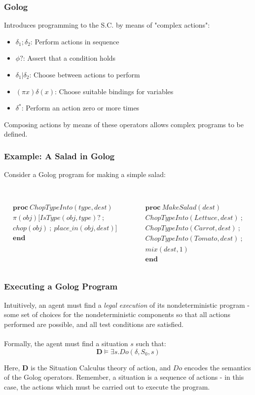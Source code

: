 \documentclass{beamer}
\begin{document}
\begin{frame}
\frametitle{Golog}
Introduces programming to the S.C. by means of "complex actions":
\begin{itemize}
  \pause
  \item $\delta_1;\delta_2$: Perform actions in sequence
  \pause
  \item $\phi?$: Assert that a condition holds
  \pause
  \item $\delta_1|\delta_2$: Choose between actions to perform
  \pause
  \item $(\pi x)\delta(x)$: Choose suitable bindings for variables
  \pause
  \item $\delta^*$: Perform an action zero or more times
  \pause
\end{itemize}
Composing actions by means of these operators allows complex programs
to be defined.
\end{frame}

\begin{frame}
\frametitle{Example: A Salad in Golog}
Consider a Golog program for making a simple salad:\\
\ \\
\begin{columns}
  \begin{column}{0.5\textwidth}
\[
\begin{array}{c}
\mathbf{proc}\ ChopTypeInto(type,dest)\\
\pi(obj)[IsType(obj,type)?\ ;\\
chop(obj)\ ;\ place\_in(obj,dest)]\\
\mathbf{end}\end{array}\]
  \end{column}
  \begin{column}{0.5\textwidth}
\[
\begin{array}{c}
\mathbf{proc}\ MakeSalad(dest)\\
ChopTypeInto(Lettuce,dest)\ ;\\
ChopTypeInto(Carrot,dest)\ ;\\
ChopTypeInto(Tomato,dest)\ ;\\
mix(dest,1)\\
\mathbf{end}\end{array}\]
  \end{column}
\end{columns}
\end{frame}

\begin{frame}
\frametitle{Executing a Golog Program}
Intuitively, an agent must find a \emph{legal execution} of its nondeterministic
program - some set of choices for the nondeterministic components so that all
actions performed are possible, and all test conditions are satisfied.\\
\ \\
Formally, the agent must find a situation $s$ such that:\[
\mathbf{D} \models \exists s . Do(\delta,S_0,s)\]

Here, $\mathbf{D}$ is the Situation Calculus theory of action, and $Do$
encodes the semantics of the Golog operators.  Remember, a situation is a sequence of actions - in this case, the actions which must be carried out to execute the program.
\end{frame}
\end{document}
